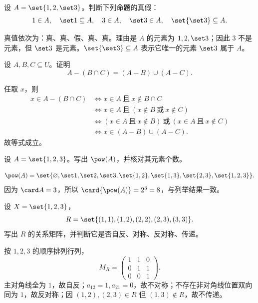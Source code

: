 %
%

\begin{exercise}[level=basic]
设 $A=\set{1,2,\set3}$。判断下列命题的真假：
  \[
  1\in A,\quad \set1\subseteq A,\quad 3\in A,\quad \set3\in A,\quad \set{\set3}\subseteq A.
  \]
\begin{solution}
真值依次为：真、真、假、真、真。理由是 $A$ 的元素为 $1,2,\set3$；因此 $3$ 不是元素，但 $\set3$ 是元素。$\set{\set3}\subseteq A$ 表示它唯一的元素 $\set3$ 属于 $A$。
\end{solution}
\end{exercise}

\begin{exercise}[level=basic]
设 $A,B,C\subseteq U$。证明
  \[
  A-(B\cap C)=(A-B)\cup(A-C).
  \]
\begin{solution}
任取 $x$，则
  \[
  \begin{aligned}
  x\in A-(B\cap C)
  &\Longleftrightarrow x\in A\ \text{且}\ x\notin B\cap C\\
  &\Longleftrightarrow x\in A\ \text{且}\ (x\notin B\ \text{或}\ x\notin C)\\
  &\Longleftrightarrow (x\in A\ \text{且}\ x\notin B)\ \text{或}\ (x\in A\ \text{且}\ x\notin C)\\
  &\Longleftrightarrow x\in(A-B)\cup(A-C).
  \end{aligned}
  \]
  故等式成立。
\end{solution}
\end{exercise}

\begin{exercise}[level=basic]
设 $A=\set{1,2,3}$。写出 $\pow(A)$，并核对其元素个数。
\begin{solution}
\[
  \pow(A)=\set{\varnothing,\set1,\set2,\set3,\set{1,2},\set{1,3},\set{2,3},\set{1,2,3}}.
  \]
  因为 $\card A=3$，所以 $\card{\pow(A)}=2^3=8$，与列举结果一致。
\end{solution}
\end{exercise}

\begin{exercise}[level=basic]
设 $X=\set{1,2,3}$，
  \[
  R=\set{(1,1),(1,2),(2,2),(2,3),(3,3)}.
  \]
  写出 $R$ 的关系矩阵，并判断它是否自反、对称、反对称、传递。
\begin{solution}
按 $1,2,3$ 的顺序排列行列，
  \[
  M_R=\begin{pmatrix}
  1&1&0\\
  0&1&1\\
  0&0&1
  \end{pmatrix}.
  \]
  主对角线全为 $1$，故自反；$a_{12}=1,a_{21}=0$，故不对称；不存在非对角线位置双向同为 $1$，故反对称；因 $(1,2),(2,3)\in R$ 但 $(1,3)\notin R$，故不传递。
\end{solution}
\end{exercise}

